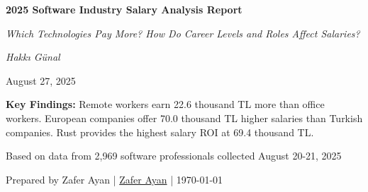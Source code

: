 \documentclass[12pt,a4paper]{article}
\begin{document}
\begin{titlepage}
    \centering
    \vspace*{1cm}
    
    
    \vspace*{2cm}
    
    \vspace{1cm}
    
    {\Huge \bfseries \color{titleblue} 2025 Software Industry Salary Analysis Report\par}
    \vspace{0.5cm}
    {\Large \itshape \color{darkgray} Which Technologies Pay More? How Do Career Levels and Roles Affect Salaries?\par}
    
    \vspace{2cm}
    
    {\Large \itshape Hakkı Günal\par}
    
    \vspace{1cm}
    
    {\large August 27, 2025\par}
    
    \vspace{2cm}
    
    {\normalsize
        \begin{minipage}{0.8\textwidth}
            \centering
            \color{darkgray}
            \textbf{Key Findings:} Remote workers earn 22.6 thousand TL more than office workers. European companies offer 70.0 thousand TL higher salaries than Turkish companies. Rust provides the highest salary ROI at 69.4 thousand TL.
        \end{minipage}
    \par}
    
    \vspace{2cm}
    
    {\normalsize \color{darkgray} Based on data from 2,969 software professionals collected August 20-21, 2025\par}
    
    \vfill
    
    {\small \color{darkgray} Prepared by Zafer Ayan | \href{http://linkedin.com/in/zaferayan/}{Zafer Ayan} | \today}
    
\end{titlepage}
\end{document}
